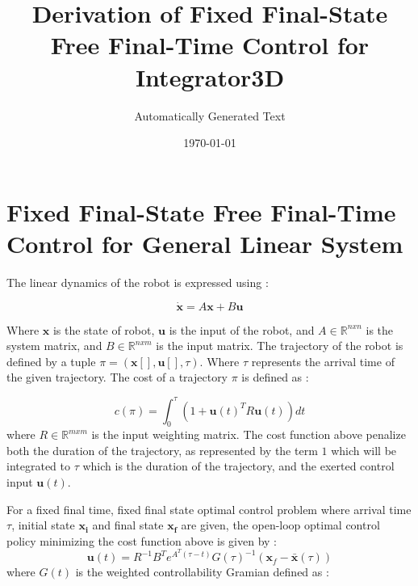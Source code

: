 \documentclass{article}%
\title{Derivation of Fixed Final{-}State Free Final{-}Time Control for Integrator3D}%
\author{Automatically Generated Text}%
\date{\today}%
\begin{document}
%
\normalsize%
\newcommand{\wrapequation}[1]{\begin{dmath} #1 \end{dmath}}%
\newcommand{\cmdequation}[1]{\begin{equation} #1 \end{equation}}%
\maketitle%
\section{Fixed Final{-}State Free Final{-}Time Control for General Linear System}%
\label{sec:Fixed Final{-}State Free Final{-}Time Control for General Linear System}%

            The linear dynamics of the robot is expressed using :

            \begin{equation} \label{state_space_eq}
            \dot{\mathbf{x}}=A\mathbf{x}+B\mathbf{u}
            \end{equation}

            Where $\boldsymbol{x}$ is the state of robot, $\boldsymbol{u}$ is the input of the robot, and $A\in \mathbb{R}^{nxn}$ is the system matrix, and $B \in \mathbb{R}^{nxm}$ is the input matrix. The trajectory of the robot is defined by a tuple $\pi = (\boldsymbol{x}[], \boldsymbol{u}[], \tau)$. Where $\tau$ represents the arrival time of the given trajectory.
            The cost of a trajectory $\pi$ is defined as :

            \begin{equation} \label{cost_eq}
            c(\pi) = \int_{0}^{\tau}(1+\boldsymbol{u}(t)^{T}R\boldsymbol{u}(t))dt
            \end{equation}
            where $R\in\mathbb{R}^{mxm}$ is the input weighting matrix. The cost function above penalize both the duration of the trajectory, as represented by the term $1$ which will be integrated to $\tau$ which is the duration of the trajectory, and the exerted control input $\boldsymbol{u}(t)$.

            For a fixed final time, fixed final state optimal control problem where arrival time $\tau$, initial state $\boldsymbol{x_{i}}$ and final state $\boldsymbol{x_{f}}$ are given, the open-loop optimal control policy minimizing the cost function above is given by :
            \begin{equation} \label{input_eq}
            \boldsymbol{u}(t) = R^{-1}B^{T}e^{A^{T}(\tau-t)}G(\tau)^{-1}(\boldsymbol{x}_{f}-\boldsymbol{\bar{x}}(\tau))
            \end{equation}
            where $G(t)$ is the weighted controllability Gramian \cite{lewis2012optimal} defined as :
\end{document}
